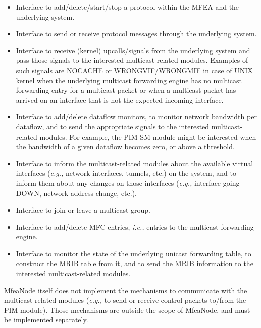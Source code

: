 \documentclass[11pt]{article}
\newcommand{\ie}{\emph{i.e.,}\xspace}
\newcommand{\eg}{\emph{e.g.,}\xspace}
\begin{document}
\begin{itemize}

  \item Interface to add/delete/start/stop a protocol within the MFEA
  and the underlying system.

  \item Interface to send or receive protocol messages through the
  underlying system.

  \item Interface to receive (kernel) upcalls/signals from the
  underlying system and pass those signals to the interested
  multicast-related modules. Examples of such signals are NOCACHE or
  WRONGVIF/WRONGMIF in case of UNIX kernel when the underlying multicast
  forwarding engine has no multicast forwarding entry for a multicast
  packet or when a multicast packet has arrived on an interface that is
  not the expected incoming interface.

  \item Interface to add/delete dataflow monitors, to monitor network
  bandwidth per dataflow, and to send the appropriate signals to the
  interested multicast-related modules. For example, the PIM-SM module
  might be interested when the bandwidth of a given dataflow becomes
  zero, or above a threshold.

  \item Interface to inform the multicast-related modules about the
  available virtual interfaces (\eg network interfaces, tunnels, etc.) on
  the system, and to inform them about any changes on those interfaces
  (\eg interface going DOWN, network address change, etc.).

  \item Interface to join or leave a multicast group.

  \item Interface to add/delete MFC entries, \ie entries to the
  multicast forwarding engine.

  \item Interface to monitor the state of the underlying unicast
  forwarding table, to construct the MRIB table from it, and to send the
  MRIB information to the interested multicast-related modules.

\end{itemize}

MfeaNode itself does not implement the mechanisms to communicate with
the multicast-related modules (\eg to send or receive control packets
to/from the PIM module). Those mechanisms are outside the scope of
MfeaNode, and must be implemented separately.
\end{document}
